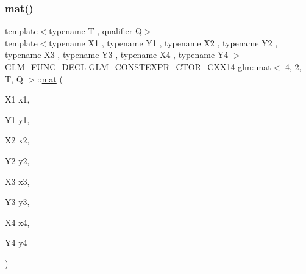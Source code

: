 \subsubsection{\texorpdfstring{mat()}{mat()}\hspace{0.1cm}{\footnotesize\ttfamily [7/21]}}
{\footnotesize\ttfamily template$<$typename T , qualifier Q$>$ \\
template$<$typename X1 , typename Y1 , typename X2 , typename Y2 , typename X3 , typename Y3 , typename X4 , typename Y4 $>$ \\
\mbox{\hyperlink{setup_8hpp_ab2d052de21a70539923e9bcbf6e83a51}{G\+L\+M\+\_\+\+F\+U\+N\+C\+\_\+\+D\+E\+CL}} \mbox{\hyperlink{setup_8hpp_a0900f9145e68bf6061b6f5e7be3fa751}{G\+L\+M\+\_\+\+C\+O\+N\+S\+T\+E\+X\+P\+R\+\_\+\+C\+T\+O\+R\+\_\+\+C\+X\+X14}} \mbox{\hyperlink{structglm_1_1mat}{glm\+::mat}}$<$ 4, 2, T, Q $>$\+::\mbox{\hyperlink{structglm_1_1mat}{mat}} (\begin{DoxyParamCaption}\item[{X1}]{x1,  }\item[{Y1}]{y1,  }\item[{X2}]{x2,  }\item[{Y2}]{y2,  }\item[{X3}]{x3,  }\item[{Y3}]{y3,  }\item[{X4}]{x4,  }\item[{Y4}]{y4 }\end{DoxyParamCaption})}

\mbox{\label{structglm_1_1mat_3_014_00_012_00_01_t_00_01_q_01_4_a0a0b79d10d539aafa1d3985616846568}} 

